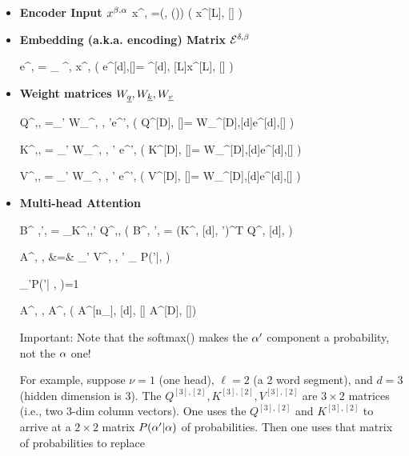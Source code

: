  
 \begin{itemize}
 
 \item {\bf Encoder Input $x^{\beta, \alpha}$}
 \beq
 x^{\beta, \alp} =\delta(\beta, \beta(\alp))
 \left(
 x^{[L], [\ell]} 
 \right)
 \eeq

\item {\bf Embedding (a.k.a. encoding) Matrix ${\cal E}^{\delta, \beta}$}

\beq
e^{\delta, \alp} = \sum_\beta 
\cale^{\delta, \beta}
x^{\beta, \alp}
\;\;
\left(
e^{[d],[\ell]}= \cale^{[d], [L]}x^{[L], [\ell]}
\right)
\eeq

\item{\bf Weight matrices $W_{\underline{q}}, W_{\underline{k}}, W_{\underline{v}}$}

\beq
Q^{\nu,\delta, \alp}=\sum_{\delta'}
W_\rvq^{\nu, \delta, \delta'}e^{\delta', \alp}
\;\;
\left(
Q^{[D], [\ell]}=
W_\rvq^{[D],[d]}e^{[d],[\ell]}
\right)
\eeq


\beq
K^{\nu,\delta, \alp}=
\sum_{\delta'}
W_\rvk^{\nu, \delta, \delta'}
e^{\delta', \alp}
\;\;
\left(
K^{[D], [\ell]}=
W_\rvk^{[D],[d]}e^{[d],[\ell]}
\right)
\eeq

\beq
V^{\nu,\delta, \alp}=
\sum_{\delta'}
W_\rvv^{\nu, \delta, \delta'}
e^{\delta', \alp}
\;\;
\left(
V^{[D], [\ell]}=
W_\rvv^{[D],[d]}e^{[d],[\ell]}
\right)
\eeq

\item {\bf Multi-head Attention}

\beq
B^{
\nu,{\alp'}, \alp}=
\sum_\delta K^{\nu,\delta,{\alp'}}
Q^{\nu,\delta,\alp}
\;\;
\left(
B^{\nu, {\alp'}, \alp}=
(K^{\nu, [d], \alp'})^T Q^{\nu, [d], \alp}
\right)
\eeq

\beqa
A^{\nu, 
\delta, \alp}&=&
\sum_{{\alp'}}
V^{\nu, \delta, {\alp'}}
_{
P({\alp'}|\alp, \nu)}
\eeqa

\beq
\sum_{{\alp'}\in [\ell]}P({\alp'}| \alp, \nu)=1
\eeq

\beq
A^{\nu, \delta, \alp}
\rarrow
A^{\Delta, \alp}
\left(
A^{[n_\rvh], [d], [\ell]}
\rarrow
A^{[D], [\ell]}\right)
\eeq


Important: Note that the softmax() makes the
${\alpha'}$ component a probability,
not the $\alpha$ one!

For example, suppose $\nu=1$ (one head), $\ell=2$ (a 2 word segment), 
and $d=3$ (hidden dimension is 3).
The $Q^{[3], [2]}, K^{[3], [2]}, V^{[3], [2]}$ are $3\times 2$ matrices
(i.e., two 3-dim column vectors).
One uses the $Q^{[3], [2]}$ and $K^{[3], [2]}$ to arrive at a 
$2\times 2$ matrix $P(\alpha'|\alpha)$
of probabilities.
Then one uses that matrix of probabilities to replace


\end{itemize}
